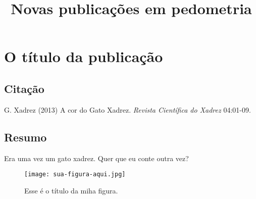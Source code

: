 %
% 
% 
% 

\title{Novas publicações em pedometria}
\maketitle


\section{O título da publicação}

\subsection{Citação}
G. Xadrez (2013) A cor do Gato Xadrez. {\em Revista Científica do Xadrez} 04:01-09. 

\subsection{Resumo}
Era uma vez um gato xadrez. Quer que eu conte outra vez?


\begin{figure}[htbp]
   \centering
   \texttt{[image: sua-figura-aqui.jpg]} %
   \caption{Esse é o título da miha figura.} %
   \label{fig:rótulo-da-figura} %
\end{figure}

